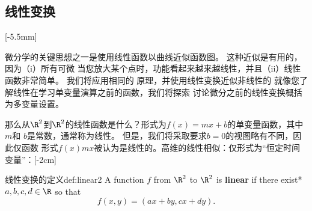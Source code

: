 \documentclass[indent]{watsonbook}
\begin{document}
{\subsection{线性变换}

\vspace{-2mm}

[-5.5mm]

\label{subsec:lintrans}

\vspace{-2mm}

微分学的关键思想之一是使用线性函数以曲线近似函数图。 这种近似是有用的，因为（i）所有可微
当您放大某个点时，功能看起来越来越线性，并且（ii）线性函数非常简单。 我们将应用相同的
原理，并使用线性变换近似非线性的 就像您了解线性在学习单变量演算之前的函数，我们将探索
讨论微分之前的线性变换概括为多变量设置。

那么从$\R^2 $到$\R^2$的线性函数是什么？形式为$ f(x)= mx + b $的单变量函数，其中$ m $和
$ b $是常数，通常称为线性。 但是，我们将采取要求$ b = 0 $的视图略有不同，因此仅函数
形式$f(x) mx $被认为是线性的。高维的线性相似：仅形式为``恒定时间变量''：[-2cm]

  \enlargethispage{5mm}

\begin{defn}{线性变换的定义}{def:linear2}
  A function $f$ from $\R^2$ to $\R^2$ is \textbf{linear} if there
  exist* $a,b,c,d \in \R$ so that 
  \[
    f(x,y) = (ax + by , cx + dy).
  \]
\end{defn}


\begin{figure}[!b]
\begin{minipage}{0.45\linewidth}
\centering
  \begin{tikzpicture}


\end{tikzpicture}
\end{minipage}
\end{figure}}
\end{document}

